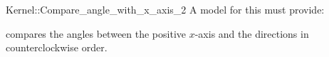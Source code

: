 \begin{ccRefFunctionObjectConcept}{Kernel::Compare_angle_with_x_axis_2}
A model for this must provide:


 {compares
  the angles between the positive $x$-axis and the directions in
  counterclockwise order.}

\end{ccRefFunctionObjectConcept}
